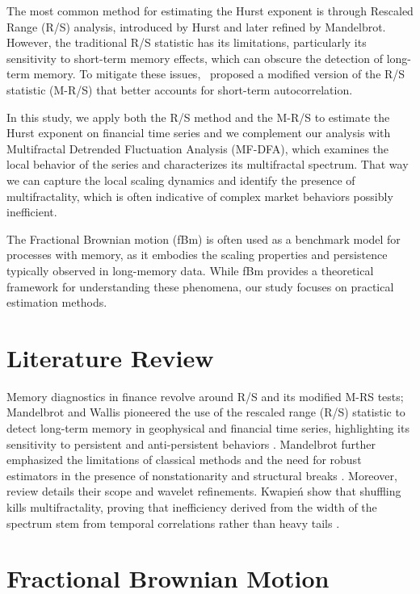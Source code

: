 \documentclass[11pt]{extarticle}
\begin{document}
The most common method for estimating the Hurst exponent is through Rescaled Range (R/S) analysis, introduced by Hurst
and later refined by Mandelbrot. However, the traditional R/S statistic has its limitations, particularly its
sensitivity to short-term memory effects, which can obscure the detection of long-term memory. To mitigate
these issues,~\cite{lo1991} proposed a modified version of the R/S statistic (M-R/S) that better accounts for short-term autocorrelation.

In this study, we apply both the R/S method and the M-R/S to estimate the Hurst exponent on financial time series and we
complement our analysis with Multifractal Detrended Fluctuation Analysis (MF-DFA), which examines the local behavior of
the series and characterizes its multifractal spectrum. That way we can capture the local scaling dynamics and
identify the presence of multifractality, which is often indicative of complex market behaviors possibly inefficient.

The Fractional Brownian motion (fBm) is often used as a benchmark model for processes with memory, as it embodies the
scaling properties and persistence typically observed in long-memory data. While fBm provides a theoretical framework
for understanding these phenomena, our study focuses on practical estimation methods.

\section{Literature Review}

Memory diagnostics in finance revolve around R/S and its modified M-RS tests; Mandelbrot and Wallis pioneered the use
of the rescaled range (R/S) statistic to detect long-term memory in geophysical and financial time series, highlighting
its sensitivity to persistent and anti-persistent behaviors \cite{mandelbrot1968, mandelbrot1969a, mandelbrot1969b}.
Mandelbrot further emphasized the limitations of classical methods and the need for robust estimators in the presence
of nonstationarity and structural breaks \cite{mandelbrot1973, mandelbrot1979}. Moreover, \cite{dimatteo2007} review details their scope
and wavelet refinements.
Kwapień show that shuffling kills multifractality, proving that inefficiency derived from the width of the spectrum
stem from temporal correlations rather than heavy tails \cite{kwapien2023}.


\section{Fractional Brownian Motion}
\end{document}
